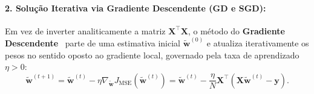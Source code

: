 ﻿\documentclass[runningheads]{llncs}
\begin{document}
\paragraph{2. Solu\c{c}\~{a}o Iterativa via Gradiente Descendente (GD e SGD):}
Em vez de inverter analiticamente a matriz $\mathbf{X}^\top \mathbf{X}$, o m\'{e}todo do \textbf{Gradiente Descendente}~\cite{robbins1951stochastic,lecun1998efficient} parte de uma estimativa inicial $\tilde{\mathbf{w}}^{(0)}$ e atualiza iterativamente os pesos no sentido oposto ao gradiente local, governado pela taxa de aprendizado $\eta > 0$:
\begin{equation}
    \tilde{\mathbf{w}}^{(t+1)} = \tilde{\mathbf{w}}^{(t)} - \eta \nabla_{\tilde{\mathbf{w}}} J_{\text{MSE}}(\tilde{\mathbf{w}}^{(t)}) = \tilde{\mathbf{w}}^{(t)} - \frac{\eta}{N} \mathbf{X}^\top (\mathbf{X}\tilde{\mathbf{w}}^{(t)} - \mathbf{y}).
    \label{eq:gd_ols}
\end{equation}
\end{document}

